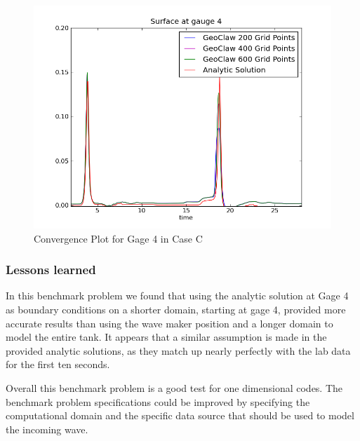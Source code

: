 \begin{figure}[ht]
\hfil\includegraphics[width=5.8in]{bp2/linearCompare}\hfil
\caption{\label{fig:linearConverge} Convergence Plot for Gage 4 in Case C }
\end{figure}


\subsubsection{Lessons learned}
In this benchmark problem we found that using the analytic solution at Gage 4 as boundary conditions on a shorter domain, starting at gage 4, provided more accurate results than using the wave maker position and a longer domain to model the entire tank.  It appears that a similar assumption is made in the provided analytic solutions, as they match up nearly perfectly with the lab data for the first ten seconds.  

Overall this benchmark problem is a good test for one dimensional codes.  The benchmark problem specifications could be improved by specifying the computational domain and the specific data source that should be used to model the incoming wave. 

